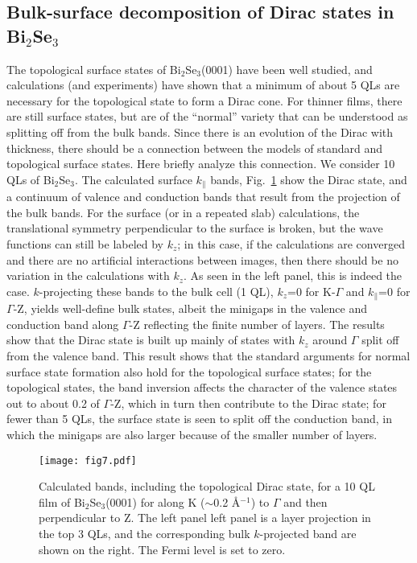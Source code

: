 \documentclass[aps,prb,showpacs,twocolumn,reprint,superscriptaddress]{revtex4-1}
\begin{document}
\subsection{Bulk-surface decomposition of Dirac states in Bi$_2$Se$_3$}

The topological surface states of Bi$_2$Se$_3$(0001) have been well studied, and calculations (and experiments)
have shown that a minimum of about 5 QLs are necessary for the topological state to form a Dirac cone. For
thinner films, there are still surface states, but are of the ``normal'' variety that
can be understood as splitting off
from the bulk bands. Since there is an evolution of the Dirac with thickness, there should be a connection
between the models of standard and topological surface states. Here briefly analyze this connection.
We consider 10 QLs of Bi$_2$Se$_3$. The calculated surface $k_\|$ bands, Fig.~\ref{fig7} show the Dirac state, and a continuum
of valence and conduction bands that result from the projection of the bulk bands. For the surface
(or in a repeated slab) calculations, the translational symmetry perpendicular to the surface is broken, but
the wave functions can still be labeled by $k_z$; in this case, if the calculations are converged and there are
no artificial interactions between images, then there should be no variation in the calculations with $k_z$. As
seen in the left panel, this is indeed the case. $k$-projecting these bands to the bulk cell (1 QL), $k_z$=0
for K-$\Gamma$ and $k_\|$=0 for $\Gamma$-Z, yields well-define bulk states, albeit the minigaps in the valence
and conduction band along $\Gamma$-Z reflecting the finite number of layers. The results show that the Dirac
state is built up mainly of states with $k_z$ around $\Gamma$ split off from the valence band. This result
shows that the standard arguments for normal surface state formation also hold for the topological surface
states; for the topological states, the band inversion affects the character of the valence states out to about
0.2 of $\Gamma$-Z, which in turn then contribute to the Dirac state; for fewer than 5 QLs, the surface state is
seen to split off the conduction band, in  which the minigaps are also larger because of the smaller number of
layers.

\begin{figure}
\texttt{[image: fig7.pdf]}
\caption{Calculated bands, including the topological Dirac state, for a 10 QL film of Bi$_2$Se$_3$(0001) for along K ($\sim$0.2 \AA$^{-1}$) to $\Gamma$
and then perpendicular to Z. The left panel left panel is a layer projection in the top 3 QLs, and the
corresponding bulk $k$-projected band are shown on the right. The Fermi level is set to zero.
}
\label{fig7}
\end{figure}
\end{document}
